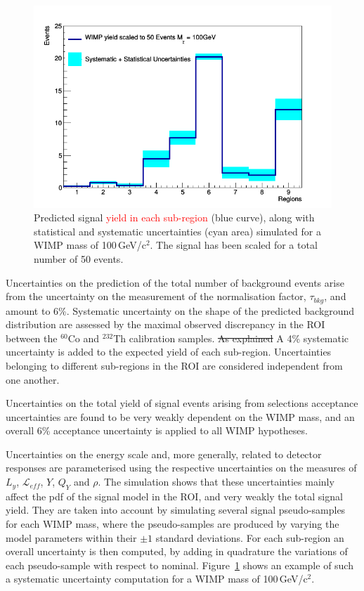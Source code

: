 \begin{figure}[t!]
  \includegraphics[width=\linewidth]{images/wimp_sys_unc.png}
  \caption{Predicted signal \textcolor{red} {yield in each sub-region} (blue curve), along with statistical and systematic uncertainties (cyan area) simulated for a WIMP mass of 100\,GeV/c$^2$.  
	   The signal has been scaled for a total number of 50 events. }
  \label{fig:unc}
\end{figure}


Uncertainties on the  prediction of the total number of background events arise from the uncertainty on the measurement of the normalisation 
factor, $\tau_{bkg}$, and amount to 6\%. %
Systematic uncertainty on the shape of the predicted background distribution are assessed by the maximal observed discrepancy in the ROI between
the $^{60}$Co and $^{232}$Th calibration samples.  
\sout{As explained} A 4\% systematic uncertainty is added  to the expected yield of each sub-region.
Uncertainties belonging to different sub-regions in the ROI are considered independent from one another.

Uncertainties on the total yield of signal events arising from selections acceptance uncertainties are found to be very weakly dependent on 
the WIMP mass, and an overall 6\% acceptance uncertainty is applied to all WIMP hypotheses. 

Uncertainties on the energy scale and, more generally, related to detector responses  are parameterised 
using the respective uncertainties on the measures of $L_y$, $\mathcal{L}_{eff}$, $Y$, $Q_Y$ and $\rho$. The simulation shows 
that these uncertainties mainly affect the pdf of the signal model in the ROI, and very weakly the total signal yield. 
They are taken into account by simulating several signal pseudo-samples for each WIMP mass, where the pseudo-samples are produced 
by varying the model parameters within their $\pm 1$ standard deviations. 
For each sub-region an overall uncertainty is then computed, by adding in quadrature the variations of each pseudo-sample 
with respect to nominal. Figure~\ref{fig:unc} shows an example of such a systematic uncertainty computation for a WIMP mass of 100\,GeV/c$^2$.


